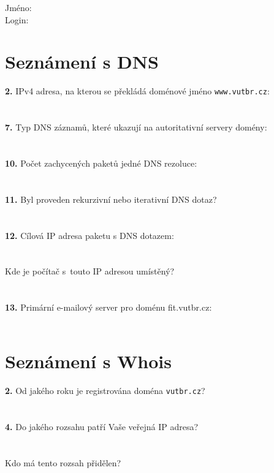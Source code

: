 Jméno:\\
Login:\\

\section{Seznámení s DNS}
\textbf{2.} IPv4 adresa, na kterou se překládá doménové jméno {\tt www.vutbr.cz}:\\
\\
\\
\textbf{7.} Typ DNS záznamů, které ukazují na autoritativní servery domény:\\
\\
\\
\textbf{10.} Počet zachycených paketů jedné DNS rezoluce: \\
\\
\\
\textbf{11.} Byl proveden rekurzivní nebo iterativní DNS dotaz?\\
\\
\\
\textbf{12.} Cílová IP adresa paketu s DNS dotazem:\\
\\
\\
Kde je počítač s~touto IP adresou umístěný?\\
\\
\\
\textbf{13.} Primární e-mailový server pro doménu fit.vutbr.cz:\\
\\


\section{Seznámení s Whois}
\textbf{2.} Od jakého roku je registrována doména {\tt vutbr.cz}?\\
\\
\\
\textbf{4.} Do jakého rozsahu patří Vaše veřejná IP adresa?\\
\\
\\
Kdo má tento rozsah přidělen?\\
\\
\\
\\
\\
\\
\\
\\
\\
\\

